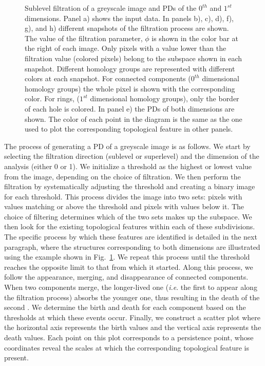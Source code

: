 \begin{figure}
\begin{minipage}[c]{0.3\textwidth}
{        Sublevel filtration of a greyscale image and PDs of the $0^{th}$ and $1^{st}$ dimensions. Panel a) shows the input data. In panels b), c), d), f), g), and h) different snapshots of the filtration process are shown. The value of the filtration parameter, $\phi$ is shown in the color bar at the right of each image. Only pixels with a value lower than the filtration value (colored pixels) belong to the subspace shown in each snapshot. Different homology groups are represented with different colors at each snapshot. For connected components ($0^{th}$ dimensional homology groups) the whole pixel is shown with the corresponding color. For rings, ($1^{st}$ dimensional homology groups), only the border of each hole is colored. In panel e) the PDs of both dimensions are shown. The color of each point in the diagram is the same as the one used to plot the corresponding topological feature in other panels.
      } \label{fig_ph: Image Filtration Example}
    \end{minipage}
  \end{figure}

The process of generating a PD of a greyscale image is as follows. We start by selecting the filtration direction (sublevel or superlevel) and the dimension of the analysis (either 0 or 1). We initialize a threshold as the highest or lowest value from the image, depending on the choice of filtration. We then perform the filtration by systematically adjusting the threshold and creating a binary image for each threshold. This process divides the image into two sets: pixels with values matching or above the threshold and pixels with values below it. The choice of filtering determines which of the two sets makes up the subspace. We then look for the existing topological features within each of these subdivisions. The specific process by which these features are identified is detailed in the next paragraph, where the structures corresponding to both dimensions are illustrated using the example shown in Fig.~\ref{fig_ph: Image Filtration Example}. We repeat this process until the threshold reaches the opposite limit to that from which it started. Along this process, we follow the appearance, merging, and disappearance of connected components. When two components merge, the longer-lived one (\textit{i.e}. the first to appear along the filtration process) absorbs the younger one, thus resulting in the death of the second \citep{eldest}. We determine the birth and death for each component based on the thresholds at which these events occur.  Finally, we construct a scatter plot where the horizontal axis represents the birth values and the vertical axis represents the death values. Each point on this plot corresponds to a persistence point, whose coordinates reveal the scales at which the corresponding topological feature is present.

